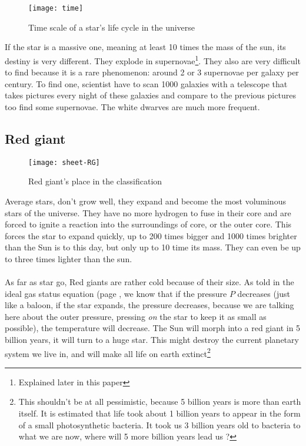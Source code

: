 \documentclass[a4paper, 11pt]{article} %
\begin{document}
\begin{figure}[h]
\centering
\texttt{[image: time]}
\caption{Time scale of a star's life cycle in the universe}
\end{figure}

If the star is a massive one, meaning at least 10 times the mass of the sun, its destiny is very different. They explode in supernovae\footnote{Explained later in this paper}. They also are very difficult to find because it is a rare phenomenon: around 2 or 3 supernovae per galaxy per century. To find one, scientist have to scan 1000 galaxies with a telescope that takes pictures every night of these galaxies and compare to the previous pictures too find some supernovae. The white dwarves are much more frequent.

\subsection{Red giant}
\begin{figure}[h]
\centering
\texttt{[image: sheet-RG]}
\caption{Red giant's place in the classification}
\end{figure}


Average stars, don't grow well, they expand and become the most voluminous stars of the universe. They have no more hydrogen to fuse in their core and are forced to ignite a reaction into the surroundings of core, or the outer core. This forces the star to expand quickly, up to 200 times bigger and 1000 times brighter than the Sun is to this day, but only up to 10 time its mass. They can even be up to three times lighter than the sun. 

\paragraph*{}
As far as star go, Red giants are rather cold because of their size. As told in the ideal gas status equation (page \pageref{GP}, we know that if the pressure $P$ decreases (just like a baloon, if the star expands, the pressure decreases, because we are talking here about the outer pressure, pressing \textit{on} the star to keep it as small as possible), the temperature will decrease.
The Sun will morph into a red giant in 5 billion years, it will turn to a huge star. This might destroy the current planetary system we live in, and will make all life on earth extinct\footnote{This shouldn't be at all pessimistic, because 5 billion years is more than earth itself. It is estimated that life took about 1 billion years to appear in the form of a small photosynthetic bacteria. It took us 3 billion years old to bacteria to what we are now, where will 5 more billion years lead us ?}
\end{document}
